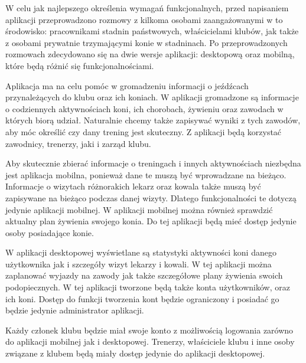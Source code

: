 \documentclass[12pt,oneside]{report}
\begin{document}
W celu jak najlepszego określenia wymagań funkcjonalnych, przed napisaniem aplikacji przeprowadzono rozmowy z kilkoma osobami zaangażowanymi w to środowisko: pracownikami stadnin państwowych, właścicielami klubów, jak także z osobami prywatnie trzymającymi konie w stadninach. Po przeprowadzonych rozmowach zdecydowano się na dwie wersje aplikacji: desktopową oraz mobilną, które będą różnić się funkcjonalnościami.

Aplikacja ma na celu pomóc w gromadzeniu informacji o jeźdźcach przynależących do klubu oraz ich koniach. W aplikacji gromadzone są informacje o codziennych aktywnościach koni, ich chorobach, żywieniu oraz zawodach w których biorą udział. Naturalnie chcemy także zapisywać wyniki z tych zawodów, aby móc określić czy dany trening jest skuteczny. Z aplikacji będą korzystać zawodnicy, trenerzy, jaki i zarząd klubu.

Aby skutecznie zbierać informacje o treningach i innych aktywnościach niezbędna jest aplikacja mobilna, ponieważ dane te muszą być wprowadzane na bieżąco. Informacje o wizytach różnorakich lekarz oraz kowala także muszą być zapisywane na bieżąco podczas danej wizyty. Dlatego funkcjonalności te dotyczą jedynie aplikacji mobilnej. W aplikacji mobilnej można również sprawdzić aktualny plan żywienia swojego konia. Do tej aplikacji będą mieć dostęp jedynie osoby posiadające konie. 

W aplikacji desktopowej wyświetlane są statystyki aktywności koni danego użytkownika jak i szczegóły wizyt lekarzy i kowali. W tej aplikacji można zaplanować wyjazdy na zawody jak także szczegółowe plany żywienia swoich podopiecznych. W tej aplikacji tworzone  będą także konta użytkowników, oraz ich koni. Dostęp do funkcji tworzenia kont będzie ograniczony i posiadać go będzie jedynie administrator aplikacji.

Każdy członek klubu będzie miał swoje konto z możliwością logowania zarówno do aplikacji mobilnej jak i desktopowej. Trenerzy, właściciele klubu i inne osoby związane z klubem będą miały dostęp jedynie do aplikacji desktopowej. 
\end{document}
